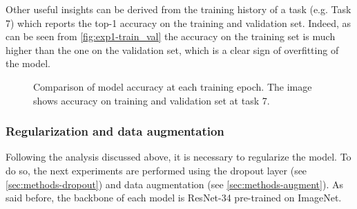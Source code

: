 Other useful insights can be derived from the training history of a task (e.g. Task 7) which reports the top-1 accuracy on the training and validation set. Indeed, as can be seen from \autoref{fig:exp1-train_val} the accuracy on the training set is much higher than the one on the validation set, which is a clear sign of overfitting of the model.

\begin{figure}[H]
    \centering
    \qquad
    \centering
    \caption{Comparison of model accuracy at each training epoch. The image shows accuracy on training and validation set at task 7.}%
    \label{fig:exp1-train_val}%
\end{figure}

\newpage
\subsubsection{Regularization and data augmentation}
Following the analysis discussed above, it is necessary to regularize the model.
To do so, the next experiments are performed using the dropout layer (see \autoref{sec:methods-dropout}) and data augmentation (see \autoref{sec:methods-augment}). As said before, the backbone of each model is ResNet-34 pre-trained on ImageNet.

